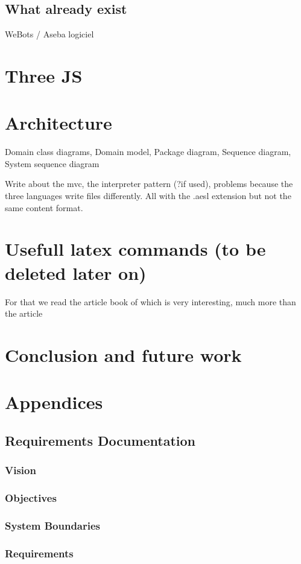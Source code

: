 \documentclass{scrartcl}
\begin{document}
\subsection{What already exist} 
WeBots / Aseba logiciel
\section{Three JS}

\section{Architecture}
Domain class diagrams,
Domain model,
Package diagram,
Sequence diagram,
System sequence diagram

Write about the mvc, the interpreter pattern (?if used), problems because the three languages write files differently. All with the .aesl extension but not the same content format.


\section{Usefull latex commands (to be deleted later on)}
For that we read the article book of \cite{Jerald:2015:VBH:2792790}
which is very interesting, much more than the article
\cite{Diniz:2017:UGO:3100317.3100324}

\section{Conclusion and future work}

\section{Appendices}
\subsection{Requirements Documentation}
\subsubsection{Vision}
\subsubsection{Objectives}
\subsubsection{System Boundaries}
\subsubsection{Requirements}
\end{document}
